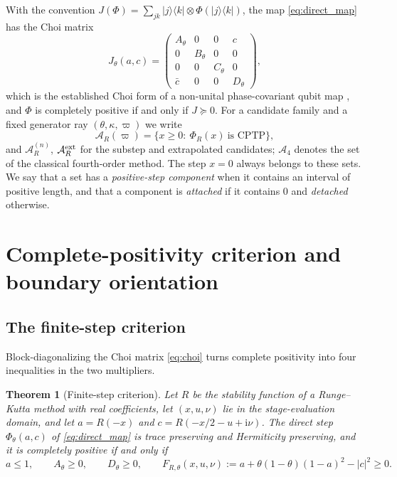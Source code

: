 \documentclass[pdflatex,sn-mathphys-num]{sn-jnl}
\newcommand{\ii}{\mathrm{i}}
\newcommand{\Fmargin}{F_{R,\theta}}
\newcommand{\Adm}{\mathcal A}
\theoremstyle{thmstyleone}
\newtheorem{theorem}{Theorem}
\theoremstyle{thmstylethree}
\theoremstyle{thmstyletwo}
\begin{document}
With the convention $J(\Phi)=\sum_{jk}|j\rangle\langle k|\otimes\Phi(|j\rangle\langle k|)$, the map \eqref{eq:direct_map} has the Choi matrix
\begin{equation}
 J_\theta(a,c)=
 \begin{pmatrix}
 A_\theta&0&0&c\\
 0&B_\theta&0&0\\
 0&0&C_\theta&0\\
 \bar c&0&0&D_\theta
 \end{pmatrix},
 \label{eq:choi}
\end{equation}
which is the established Choi form of a non-unital phase-covariant qubit map \mbox{\cite{Choi1975CP,RuskaiSzarekWerner2002,Siudzinska2023Geometry}}, and $\Phi$ is completely positive if and only if $J\succeq0$. For a candidate family and a fixed generator ray $(\theta,\kappa,\varpi)$ we write
\begin{equation}
 \Adm_R(\varpi)=\{x\ge0:\ \Phi_R(x)\ \text{is CPTP}\},
 \label{eq:admissible_set}
\end{equation}
and $\Adm_R^{(n)}$, $\Adm_R^{\rm ext}$ for the substep and extrapolated candidates; $\Adm_4$ denotes the set of the classical fourth-order method. The step $x=0$ always belongs to these sets. We say that a set has a \emph{positive-step component} when it contains an interval of positive length, and that a component is \emph{attached} if it contains $0$ and \emph{detached} otherwise.
\section{Complete-positivity criterion and boundary orientation}\label{sec:criterion}

\subsection{The finite-step criterion}\label{sec:finite_step}

Block-diagonalizing the Choi matrix \eqref{eq:choi} turns complete positivity into four inequalities in the two multipliers.

\begin{theorem}[Finite-step criterion]\label{thm:criterion}
Let $R$ be the stability function of a Runge--Kutta method with real coefficients, let $(x,u,\nu)$ lie in the stage-evaluation domain, and let $a=R(-x)$ and $c=R(-x/2-u+\ii\nu)$. The direct step $\Phi_\theta(a,c)$ of \eqref{eq:direct_map} is trace preserving and Hermiticity preserving, and it is completely positive if and only if
\begin{equation}
 a\le1,\qquad A_\theta\ge0,\qquad D_\theta\ge0,\qquad
 \Fmargin(x,u,\nu):=a+\theta(1-\theta)(1-a)^2-|c|^2\ge0.
 \label{eq:criterion}
\end{equation}
\end{theorem}
\end{document}
